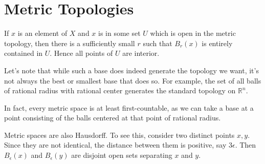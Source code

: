 
\section*{Metric Topologies}







If $x$ is an element of $X$ and $x$ is in some set $U$ which is open in the metric topology, then there is a sufficiently small $r$ such that $B_r(x)$ is entirely contained in $U$.  Hence all points of $U$ are interior.

Let's note that while such a base does indeed generate the topology we want, it's not always the best or smallest base that does so.  For example, the set of all balls of rational radius with rational center generates the standard topology on $\mathbb{R}^n$.

In fact, every metric space is at least first-countable, as we can take a base at a point consisting of the balls centered at that point of rational radius.

Metric spaces are also Hausdorff.  To  see this, consider two distinct points $x,y$.  Since they are not identical, the distance between them is positive, say $3\epsilon$.  Then $B_\epsilon(x)$ and $B_\epsilon(y)$ are disjoint open sets separating $x$ and $y$.


